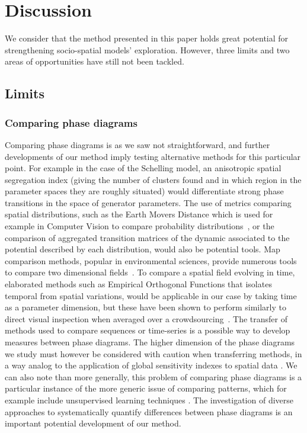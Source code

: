 \documentclass{JASSS}
\begin{document}
\section{Discussion}

We consider that the method presented in this paper holds great potential for strengthening socio-spatial models' exploration. However, three limits and two areas of opportunities have still not been tackled. 

\subsection{Limits}

\subsubsection{Comparing phase diagrams}

Comparing phase diagrams is as we saw not straightforward, and further developments of our method imply testing alternative methods for this particular point. For example in the case of the Schelling model, an anisotropic spatial segregation index (giving the number of clusters found and in which region in the parameter spaces they are roughly situated) would differentiate strong phase transitions in the space of generator parameters. The use of metrics comparing spatial distributions, such as the Earth Movers Distance which is used for example in Computer Vision to compare probability distributions~\citep{rubner2000earth}, or the comparison of aggregated transition matrices of the dynamic associated to the potential described by each distribution, would also be potential tools. Map comparison methods, popular in environmental sciences, provide numerous tools to compare two dimensional fields~\citep{visser2006map,kuhnert2005comparing}. To compare a spatial field evolving in time, elaborated methods such as Empirical Orthogonal Functions that isolates temporal from spatial variations, would be applicable in our case by taking time as a parameter dimension, but these have been shown to perform similarly to direct visual inspection when averaged over a crowdsourcing~\citep{10.1371/journal.pone.0178165}. The transfer of methods used to compare sequences \citep{kruskal1983overview} or time-series \citep{liao2005clustering} is a possible way to develop measures between phase diagrams. The higher dimension of the phase diagrams we study must however be considered with caution when transferring methods, in a way analog to the application of global sensitivity indexes to spatial data \citep{lilburne2009sensitivity}. We can also note than more generally, this problem of comparing phase diagrams is a particular instance of the more generic issue of comparing patterns, which for example include unsupervised learning techniques \citep{hastie2009unsupervised}. The investigation of diverse approaches to systematically quantify differences between phase diagrams is an important potential development of our method.
\end{document}
